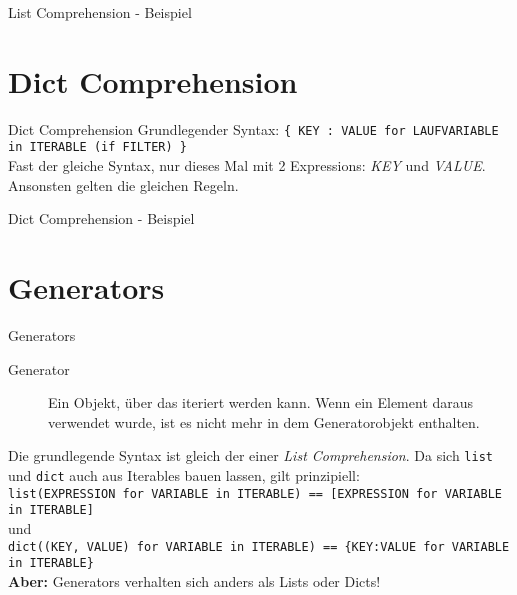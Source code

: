 \begin{frame}{List Comprehension - Beispiel}
	
\end{frame}



\section{Dict Comprehension}
\begin{frame}{Dict Comprehension}
  Grundlegender Syntax: \alert{\texttt{\{ KEY : VALUE for LAUFVARIABLE in ITERABLE (if FILTER) \}}}\\[.75cm]
  Fast der gleiche Syntax, nur dieses Mal mit 2 Expressions: \textit{KEY} und \textit{VALUE}. Ansonsten gelten die gleichen Regeln.
\end{frame}

\begin{frame}{Dict Comprehension - Beispiel}
	
\end{frame}



\section{Generators}
\begin{frame}{Generators}
	\begin{description}
		\item[Generator] Ein Objekt, \"uber das iteriert werden kann. Wenn ein Element daraus verwendet wurde, ist es nicht mehr in dem Generatorobjekt enthalten.\\[.5cm]
	\end{description}
	
	Die grundlegende Syntax ist gleich der einer \textit{List Comprehension}.
	Da sich \alert{\texttt{list}} und \alert{\texttt{dict}} auch aus Iterables bauen lassen, gilt prinzipiell:\\[.25cm]

		\alert{\texttt{list(EXPRESSION for VARIABLE in ITERABLE) == [EXPRESSION for VARIABLE in ITERABLE]}}\\[.25cm]
		und\\[.25cm]
		\alert{\texttt{dict((KEY, VALUE) for VARIABLE in ITERABLE) == \{KEY:VALUE for VARIABLE in ITERABLE\}}}\\[.25cm]

	\textbf{Aber:} Generators verhalten sich anders als Lists oder Dicts!

\end{frame}





